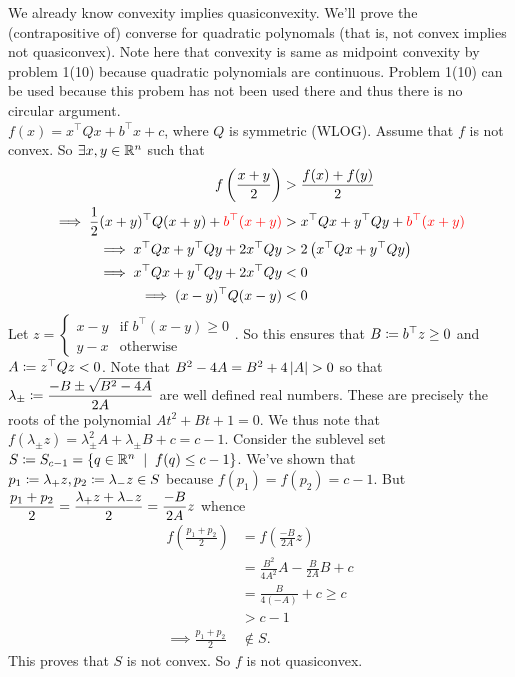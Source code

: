 \begin{enumerate}[leftmargin=*]
We already know convexity implies quasiconvexity. We'll prove the (contrapositive of) converse for quadratic polynomals (that is, not convex implies not quasiconvex). Note here that convexity is same as midpoint convexity by problem 1(10) because quadratic polynomials are continuous. Problem 1(10) can be used because this probem has not been used there and thus there is no circular argument.\\
$f(x) = x^{\top} Q x + b^{\top}x + c$, where $Q$ is symmetric (WLOG). Assume that $f$ is not convex. So $\exists x,y\in\mathbb{R}^{n}$ such that 
\begin{align*}
f\left(\frac{x+y}{2}\right) &> \frac{f(x)+f(y)}{2}\\
\implies \frac{1}{2}(x+y)^{\top}Q(x+y) + {\color{red}b^{\top} (x+y)} &> x^{\top}Qx + y^{\top}Qy + {\color{red}b^{\top} (x+y)}\\
\implies x^{\top}Qx + y^{\top}Qy + 2 x^{\top}Qy &> 2\left(x^{\top}Qx + y^{\top}Qy\right)\\
\implies x^{\top}Qx + y^{\top}Qy + 2 x^{\top}Qy &< 0\\
\implies (x-y)^{\top}Q(x-y) &< 0
\end{align*}
Let $z = \begin{cases}x-y &\text{if } b^{\top}(x-y)\ge 0\\ y-x&\text{otherwise}\end{cases}$. So this ensures that $B\coloneqq b^{\top} z\ge 0$ and $A\coloneqq z^{\top}Qz<0$. Note that $B^{2}-4A = B^{2}+4\abs A>0$ so that $\displaystyle \lambda_{\pm}\coloneqq \frac{-B\pm\sqrt{B^{2}-4A}}{2A}$ are well defined real numbers. These are precisely the roots of the polynomial $At^{2}+Bt+1=0$. We thus note that $f(\lambda_{\pm} z) = \lambda_{\pm}^{2}A + \lambda_{\pm} B + c = c-1$. Consider the sublevel set $S\sett S_{c-1} = \set{q\in \R^{n}\st f(q)\leq c-1}$. We've shown that $p_{1}\coloneqq\lambda_{+} z, p_{2}\coloneqq\lambda_{-} z\in S$ because $f(p_{1}) = f(p_{2}) = c-1$. But $\displaystyle \frac{p_{1}+p_{2}}{2} = \frac{\lambda_{+}z + \lambda_{-}z}{2} = \frac{-B}{2A}z$ whence \begin{align*}
f\left(\frac{p_{1}+p_{2}}{2}\right) &= f\left(\frac{-B}{2A}z\right)\\
&= \frac{B^{2}}{4A^{2}}A - \frac{B}{2A}B + c\\
&= \frac{B}{4(-A)} + c \ge c \\
&> c-1 \\
\implies \frac{p_{1}+p_{2}}{2} &\notin S.
\end{align*}
This proves that $S$ is not convex. So $f$ is not quasiconvex.



\end{enumerate}
